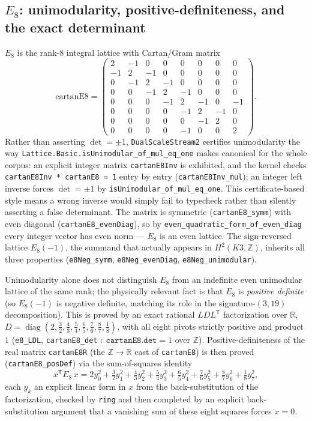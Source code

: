 \documentclass[11pt,a4paper]{article}
\theoremstyle{remark}
\begin{document}
\subsection{$E_8$: unimodularity, positive-definiteness, and the exact determinant}
\label{sec:e8}
$E_8$ is the rank-8 integral lattice with Cartan/Gram matrix
\begin{equation}
  \mathrm{cartanE8} =
  \begin{pmatrix}
   2&-1&0&0&0&0&0&0\\
   -1&2&-1&0&0&0&0&0\\
   0&-1&2&-1&0&0&0&0\\
   0&0&-1&2&-1&0&0&0\\
   0&0&0&-1&2&-1&0&-1\\
   0&0&0&0&-1&2&-1&0\\
   0&0&0&0&0&-1&2&0\\
   0&0&0&0&-1&0&0&2
  \end{pmatrix}.
\end{equation}
Rather than asserting $\det=\pm 1$, \texttt{DualScaleStream2} certifies unimodularity the way
\texttt{Lattice.Basic.isUnimodular\_of\_mul\_eq\_one} makes canonical for the whole corpus: an
explicit integer matrix \texttt{cartanE8Inv} is exhibited, and the kernel checks
\texttt{cartanE8Inv * cartanE8 = 1} entry by entry (\texttt{cartanE8Inv\_mul}); an integer left
inverse forces $\det=\pm1$ by \texttt{isUnimodular\_of\_mul\_eq\_one}. This certificate-based
style means a wrong inverse would simply fail to typecheck rather than silently asserting a false
determinant. The matrix is symmetric (\texttt{cartanE8\_symm}) with even diagonal
(\texttt{cartanE8\_evenDiag}), so by \texttt{even\_quadratic\_form\_of\_even\_diag} every integer
vector has even norm --- $E_8$ is an even lattice. The sign-reversed lattice $E_8(-1)$, the
summand that actually appears in $H^2(K3,\mathbb{Z})$, inherits all three properties
(\texttt{e8Neg\_symm}, \texttt{e8Neg\_evenDiag}, \texttt{e8Neg\_unimodular}).

Unimodularity alone does not distinguish $E_8$ from an indefinite even unimodular lattice of the
same rank; the physically relevant fact is that $E_8$ is \emph{positive definite} (so $E_8(-1)$ is
negative definite, matching its role in the signature-$(3,19)$ decomposition). This is proved by
an exact rational $LDL^\mathsf{T}$ factorization over $\mathbb{R}$,
$D=\operatorname{diag}\!\left(2,\tfrac32,\tfrac43,\tfrac54,\tfrac65,\tfrac76,\tfrac87,\tfrac18\right)$,
with all eight pivots strictly positive and product $1$ (\texttt{e8\_LDL}, \texttt{cartanE8\_det}
$:\ \mathtt{cartanE8.det}=1$ over $\mathbb{Z}$). Positive-definiteness of the real matrix
\texttt{cartanE8R} (the $\mathbb{Z}\to\mathbb{R}$ cast of \texttt{cartanE8}) is then proved
(\texttt{cartanE8\_posDef}) via the sum-of-squares identity
\begin{equation}
  x^{\mathsf T} E_8\, x = 2y_0^2+\tfrac32 y_1^2+\tfrac43 y_2^2+\tfrac54 y_3^2+\tfrac65 y_4^2+\tfrac76 y_5^2+\tfrac87 y_6^2+\tfrac18 y_7^2,
\end{equation}
each $y_k$ an explicit linear form in $x$ from the back-substitution of the factorization, checked
by \texttt{ring} and then completed by an explicit back-substitution argument that a vanishing sum
of these eight squares forces $x=0$.
\end{document}

